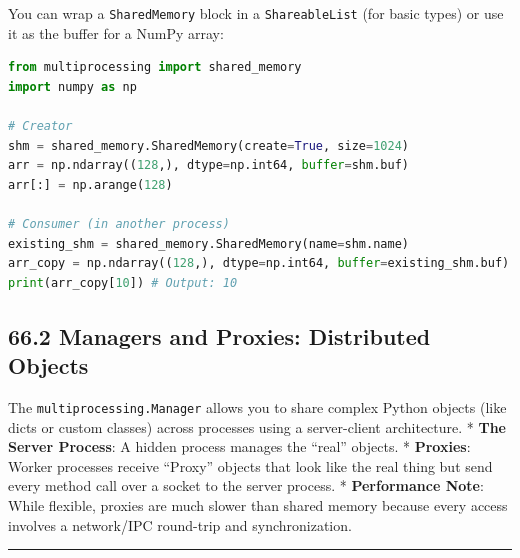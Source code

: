 You can wrap a \passthrough{\lstinline!SharedMemory!} block in a
\passthrough{\lstinline!ShareableList!} (for basic types) or use it as
the buffer for a NumPy array:

\begin{lstlisting}[language=Python]
from multiprocessing import shared_memory
import numpy as np

# Creator
shm = shared_memory.SharedMemory(create=True, size=1024)
arr = np.ndarray((128,), dtype=np.int64, buffer=shm.buf)
arr[:] = np.arange(128)

# Consumer (in another process)
existing_shm = shared_memory.SharedMemory(name=shm.name)
arr_copy = np.ndarray((128,), dtype=np.int64, buffer=existing_shm.buf)
print(arr_copy[10]) # Output: 10
\end{lstlisting}

\hypertarget{managers-and-proxies-distributed-objects}{%
\subsection{66.2 Managers and Proxies: Distributed
Objects}\label{managers-and-proxies-distributed-objects}}

The \passthrough{\lstinline!multiprocessing.Manager!} allows you to
share complex Python objects (like dicts or custom classes) across
processes using a server-client architecture. * \textbf{The Server
Process}: A hidden process manages the ``real'' objects. *
\textbf{Proxies}: Worker processes receive ``Proxy'' objects that look
like the real thing but send every method call over a socket to the
server process. * \textbf{Performance Note}: While flexible, proxies are
much slower than shared memory because every access involves a
network/IPC round-trip and synchronization.

\begin{center}\rule{0.5\linewidth}{0.5pt}\end{center}
